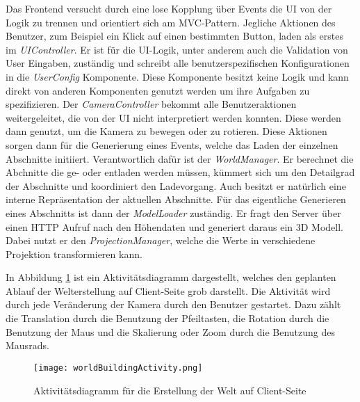 Das Frontend versucht durch eine lose Kopplung über Events die UI von der Logik zu trennen und orientiert sich am MVC-Pattern. Jegliche Aktionen des Benutzer, zum Beispiel ein Klick auf einen bestimmten Button, laden als erstes im \textit{UIController}. Er ist für die UI-Logik, unter anderem auch die Validation von User Eingaben, zuständig und schreibt alle benutzerspezifischen Konfigurationen in die \textit{UserConfig} Komponente. Diese Komponente besitzt keine Logik und kann direkt von anderen Komponenten genutzt werden um ihre Aufgaben zu spezifizieren. Der \textit{CameraController} bekommt alle Benutzeraktionen weitergeleitet, die von der UI nicht interpretiert werden konnten. Diese werden dann genutzt, um die Kamera zu bewegen oder zu rotieren. Diese Aktionen sorgen dann für die Generierung eines Events, welche das Laden der einzelnen Abschnitte initiiert. Verantwortlich dafür ist der \textit{WorldManager}. Er berechnet die Abchnitte die ge- oder entladen werden müssen, kümmert sich um den Detailgrad der Abschnitte und koordiniert den Ladevorgang. Auch besitzt er natürlich eine interne Repräsentation der aktuellen Abschnitte. Für das eigentliche Generieren eines Abschnitts ist dann der \textit{ModelLoader} zuständig. Er fragt den Server über einen HTTP Aufruf nach den Höhendaten und generiert daraus ein 3D Modell. Dabei nutzt er den \textit{ProjectionManager}, welche die Werte in verschiedene Projektion transformieren kann.

In Abbildung \ref{worldBuildingActivity} ist ein Aktivitätsdiagramm dargestellt, welches den geplanten Ablauf der Welterstellung auf Client-Seite grob darstellt. Die Aktivität wird durch jede Veränderung der Kamera durch den Benutzer gestartet. Dazu zählt die Translation durch die Benutzung der Pfeiltasten, die Rotation durch die Benutzung der Maus und die Skalierung oder Zoom durch die Benutzung des Mausrads.

\begin{figure}[H]
  \texttt{[image: worldBuildingActivity.png]}
  \caption{Aktivitätsdiagramm für die Erstellung der Welt auf Client-Seite}
  \label{worldBuildingActivity}
\end{figure}

